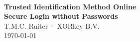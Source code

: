 \begin{center}
\noindent\dashes\newline
\huge
\textsf{\textbf{\textcolor{darkxor}{\TIMO}}}\\
\textsf{\textbf{\textcolor{darkxor}{Trusted Identification Method Online}}}\\
\large\vspace{3mm}\textsf{\textbf{\textcolor{darkxor}{Secure Login without Passwords}}}\\
\rmfamily
\normalsize
\dashes
\Large
\vspace*{1.0cm}
\textrm{T.M.C. Ruiter~-~XORkey B.V.}\\
\vspace{0.5cm}
\today
\normalsize
\vspace*{1.0cm}
\end{center}
\dashes
\newcommand{\includesection}[1]{\newpage}
\newcommand{\includesectionnopagebreak}[1]{}
\includesection{abstract}
\tableofcontents
\includesection{summary}
\includesection{general}
\includesection{dummies}
\includesection{schema}
\includesection{login}


\includesectionnopagebreak{conclusion}


\listoftables
\cleardoublepage
\begin{appendices}
\includesection{security}
\includesection{implementation}
\end{appendices}

